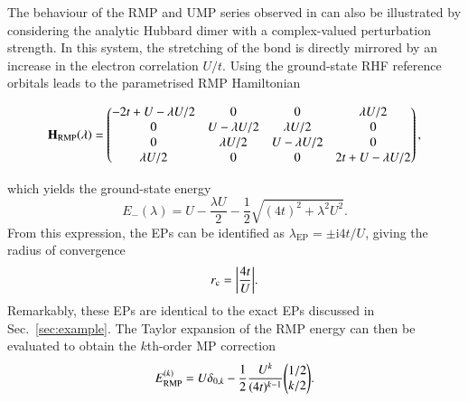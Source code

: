\documentclass[aps,prb,reprint,noshowkeys,linenumbers,superscriptaddress]{revtex4-1}
\newcommand{\bH}{\mathbf{H}}
\renewcommand{\i}{\mathrm{i}} %
\newcommand{\rc}{r_{\text{c}}}
\newcommand{\lep}{\lambda_{\text{EP}}}
\begin{document}
The behaviour of the RMP and UMP series observed in  can also be illustrated by considering
the analytic Hubbard dimer with a complex-valued perturbation strength.
In this system, the stretching of the  bond is directly mirrored by an increase in the electron correlation $U/t$.
Using the ground-state RHF reference orbitals leads to the parametrised RMP Hamiltonian
\begin{widetext}
\begin{equation}
\label{eq:H_RMP}
\bH_\text{RMP}\qty(\lambda) = 
	\begin{pmatrix}
		-2t + U - \lambda U/2	&	0					&	0					&	\lambda U/2	\\
		0						&	U - \lambda U/2 	&	\lambda U/2			&	0	\\
		0						&	\lambda U/2			&	U - \lambda U/2 	&	0	\\
		\lambda U/2 			&	0 					&	0					&	2t + U - \lambda U/2	\\
	\end{pmatrix},
\end{equation}
\end{widetext}
which yields the ground-state energy 
\begin{equation}
	\label{eq:E0MP}
	E_{-}(\lambda) = U - \frac{\lambda U}{2} - \frac{1}{2} \sqrt{(4t)^2 + \lambda ^2 U^2}.
\end{equation}
From this expression, the EPs can be identified as $\lep = \pm \i 4t / U$,
giving the radius of convergence
\begin{equation}
    \rc = \abs{\frac{4t}{U}}.
\end{equation}
Remarkably, these EPs are identical to the exact EPs discussed in Sec.~\ref{sec:example}.
The Taylor expansion of the RMP energy can then be evaluated to obtain the $k$th-order MP correction
\begin{equation}
	E_\text{RMP}^{(k)} = U \delta_{0,k} - \frac{1}{2} \frac{U^k}{(4t)^{k-1}} \mqty( 1/2 \\ k/2).
\end{equation}
 
\end{document}

